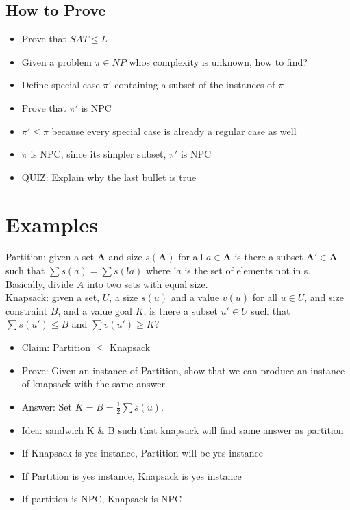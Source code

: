 \documentclass[12pt, letter]{article}
\begin{document}
\subsection*{How to Prove}
\begin{itemize}
	\item Prove that $SAT \le L$
	\item Given a problem $\pi \in NP$ whos complexity is unknown, how to find?
	\item Define special case $\pi'$ containing a subset of the instances of  $\pi$ 
	\item Prove that $\pi'$ is NPC
	\item $\pi' \le \pi$ because every special case is already a regular case as well
	\item $\pi$ is NPC, since its simpler subset, $\pi'$ is NPC
	\item QUIZ: Explain why the last bullet is true
\end{itemize}


\section{Examples}%
\label{sec:examples}
Partition: given a set \textbf{A} and size $s(\bm{A})$ for all $a \in \bm{A}$ is there a subset $\bm{A'} \in \bm{A}$ such that $\sum s(a) = \sum s(!a)$ where  $!a$ is the set of elements not in s. Basically, divide $A$ into two sets with equal size. \\

Knapsack: given a set, $U$, a size $s(u)$ and a value  $v(u)$ for all $u \in U$, and size constraint  $B$, and a value goal $K$, is there a subset $u'\in U$ such that $\sum s(u') \le B$ and $\sum v(u') \ge K$? \\

\begin{itemize}
 \item Claim: Partition $\le$ Knapsack
 \item Prove: Given an instance of Partition, show that we can produce an instance of knapsack with the same answer.
 \item Answer: Set $K=B=\frac{1}{2}\sum s(u)$.
 \item Idea: sandwich K \& B such that knapsack will find same answer as partition
 \item If Knapsack is yes instance, Partition will be yes instance
 \item If Partition is yes instance, Knapsack is yes instance
 \item If partition is NPC, Knapsack is NPC
\end{itemize}
\end{document}
